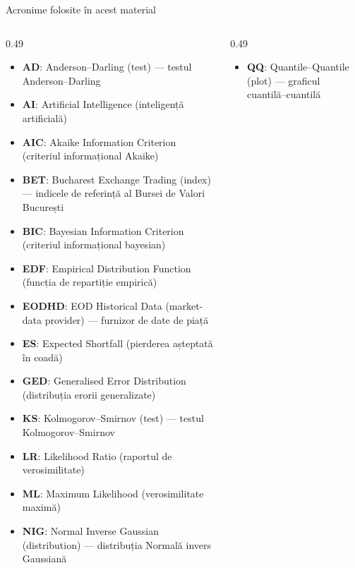 {
\begin{frame}[noframenumbering]
    \titlepage
\end{frame}
}
\begin{frame}{Acronime folosite în acest material}
\begin{columns}[T]
\begin{column}{0.49\textwidth}
\begin{itemize}\setlength{\itemsep}{0pt}
    \item \textbf{AD}: Anderson–Darling (test) — testul Anderson–Darling
    \item \textbf{AI}: Artificial Intelligence (inteligență artificială)
    \item \textbf{AIC}: Akaike Information Criterion (criteriul informațional Akaike)
    \item \textbf{BET}: Bucharest Exchange Trading (index) — indicele de referință al Bursei de Valori București
    \item \textbf{BIC}: Bayesian Information Criterion (criteriul informațional bayesian)
    \item \textbf{EDF}: Empirical Distribution Function (funcția de repartiție empirică)
    \item \textbf{EODHD}: EOD Historical Data (market-data provider) — furnizor de date de piață
    \item \textbf{ES}: Expected Shortfall (pierderea așteptată în coadă)
    \item \textbf{GED}: Generalised Error Distribution (distribuția erorii generalizate)
    \item \textbf{KS}: Kolmogorov–Smirnov (test) — testul Kolmogorov–Smirnov
    \item \textbf{LR}: Likelihood Ratio (raportul de verosimilitate)
    \item \textbf{ML}: Maximum Likelihood (verosimilitate maximă)
    \item \textbf{NIG}: Normal Inverse Gaussian (distribution) — distribuția Normală invers Gaussiană
\end{itemize}
\end{column}
\begin{column}{0.49\textwidth}
\begin{itemize}\setlength{\itemsep}{0pt}
    \item \textbf{QQ}: Quantile–Quantile (plot) — graficul cuantilă–cuantilă
\end{itemize}
\end{column}
\end{columns}
\end{frame}

